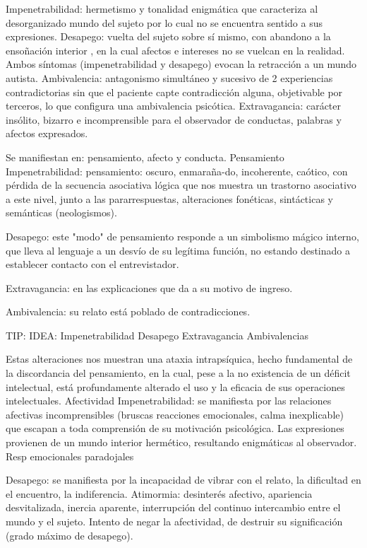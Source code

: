\documentclass[encares.tex]{subfiles}
\begin{document}
Impenetrabilidad: hermetismo y tonalidad enigmática que caracteriza al desorganizado mundo del sujeto por lo cual no se encuentra sentido a sus expresiones. Desapego: vuelta del sujeto sobre sí mismo, con abandono a la ensoñación interior , en la cual afectos e intereses no se vuelcan en la realidad. Ambos síntomas (impenetrabilidad y desapego) evocan la retracción a un mundo autista. Ambivalencia: antagonismo simultáneo y sucesivo de 2 experiencias contradictorias sin que el paciente capte contradicción alguna, objetivable por terceros, lo que configura una ambivalencia psicótica. Extravagancia: carácter insólito, bizarro e incomprensible para el observador de conductas, palabras y afectos expresados.

Se manifiestan en: pensamiento, afecto y conducta. Pensamiento Impenetrabilidad: pensamiento: oscuro, enmaraña-do, incoherente, caótico, con pérdida de la secuencia asociativa lógica que nos muestra un trastorno asociativo a este nivel, junto a las pararrespuestas, alteraciones fonéticas, sintácticas y semánticas (neologismos).

Desapego: este "modo" de pensamiento responde a un simbolismo mágico interno, que lleva al lenguaje a un desvío de su legítima función, no estando destinado a establecer contacto con el entrevistador.

Extravagancia: en las explicaciones que da a su motivo de ingreso.

Ambivalencia: su relato está poblado de contradicciones.

TIP: IDEA: Impenetrabilidad Desapego Extravagancia Ambivalencias

Estas alteraciones nos muestran una ataxia intrapsíquica, hecho fundamental de la discordancia del pensamiento, en la cual, pese a la no existencia de un déficit intelectual, está profundamente alterado el uso y la eficacia de sus operaciones intelectuales. Afectividad Impenetrabilidad: se manifiesta por las relaciones afectivas incomprensibles (bruscas reacciones emocionales, calma inexplicable) que escapan a toda comprensión de su motivación psicológica. Las expresiones provienen de un mundo interior hermético, resultando enigmáticas al observador. Resp emocionales paradojales

Desapego: se manifiesta por la incapacidad de vibrar con el relato, la dificultad en el encuentro, la indiferencia. Atimormia: desinterés afectivo, apariencia desvitalizada, inercia aparente, interrupción del continuo intercambio entre el mundo y el sujeto. Intento de negar la afectividad, de destruir su significación (grado máximo de desapego).
\end{document}
